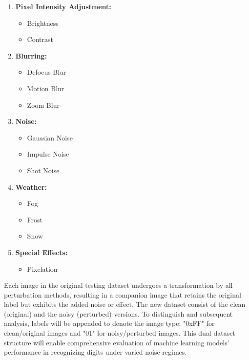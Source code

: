 \begin{enumerate}
    \item \textbf{Pixel Intensity Adjustment:}
    \begin{itemize}
        \item Brightness
        \item Contrast
    \end{itemize}
    \item \textbf{Blurring:}
    \begin{itemize}
        \item Defocus Blur
        \item Motion Blur
        \item Zoom Blur
    \end{itemize}
    \item \textbf{Noise:}
    \begin{itemize}
        \item Gaussian Noise
        \item Impulse Noise
        \item Shot Noise
    \end{itemize}
    \item \textbf{Weather:}
    \begin{itemize}
        \item Fog
        \item Frost
        \item Snow
    \end{itemize}
    \item \textbf{Special Effects:}
    \begin{itemize}
        \item Pixelation
    \end{itemize}
\end{enumerate}

Each image in the original testing dataset undergoes a transformation by all perturbation methods, resulting in a companion image that retains the original label but exhibits the added noise or effect. The new dataset consist of the clean (original) and the noisy (perturbed) versions. 
To distinguish and subsequent analysis, labels will be appended to denote the image type: "0xFF" for clean/original images and "01" for noisy/perturbed images. This dual dataset structure will enable comprehensive evaluation of machine learning models' performance in recognizing digits under varied noise regimes.

